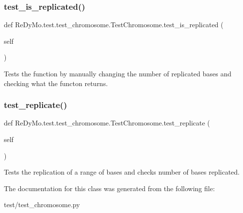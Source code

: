 \subsubsection{\texorpdfstring{test\+\_\+is\+\_\+replicated()}{test\_is\_replicated()}}
{\footnotesize\ttfamily def Re\+Dy\+Mo.\+test.\+test\+\_\+chromosome.\+Test\+Chromosome.\+test\+\_\+is\+\_\+replicated (\begin{DoxyParamCaption}\item[{}]{self }\end{DoxyParamCaption})}



Tests the function by manually changing the number of replicated bases and checking what the functon returns. 

\mbox{\label{classReDyMo_1_1test_1_1test__chromosome_1_1TestChromosome_a22ef06b4ce026761f08ffb7bfca2809a}} 
\subsubsection{\texorpdfstring{test\+\_\+replicate()}{test\_replicate()}}
{\footnotesize\ttfamily def Re\+Dy\+Mo.\+test.\+test\+\_\+chromosome.\+Test\+Chromosome.\+test\+\_\+replicate (\begin{DoxyParamCaption}\item[{}]{self }\end{DoxyParamCaption})}



Tests the replication of a range of bases and checks number of bases replicated. 



The documentation for this class was generated from the following file\+:\begin{DoxyCompactItemize}
\item 
test/test\+\_\+chromosome.\+py\end{DoxyCompactItemize}
